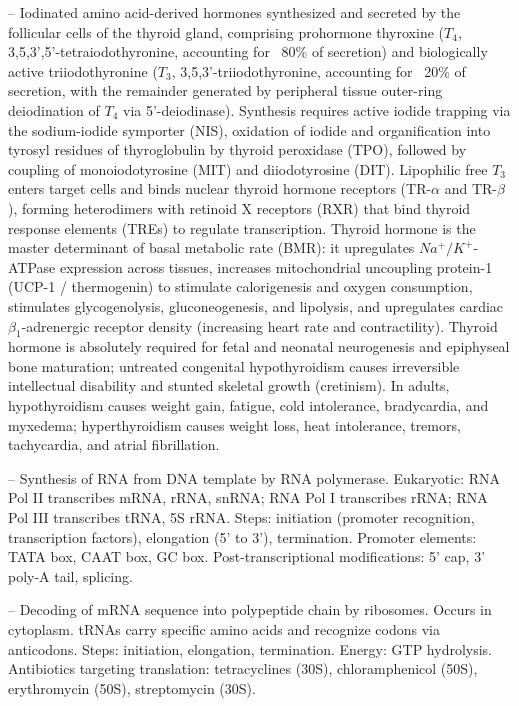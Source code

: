 -- Iodinated amino acid-derived hormones synthesized and secreted by the follicular cells of the thyroid gland, comprising prohormone thyroxine ($T_4$, 3,5,3',5'-tetraiodothyronine, accounting for ~80\% of secretion) and biologically active triiodothyronine ($T_3$, 3,5,3'-triiodothyronine, accounting for ~20\% of secretion, with the remainder generated by peripheral tissue outer-ring deiodination of $T_4$ via 5'-deiodinase). Synthesis requires active iodide trapping via the sodium-iodide symporter (NIS), oxidation of iodide and organification into tyrosyl residues of thyroglobulin by thyroid peroxidase (TPO), followed by coupling of monoiodotyrosine (MIT) and diiodotyrosine (DIT). Lipophilic free $T_3$ enters target cells and binds nuclear thyroid hormone receptors (TR-$\alpha$ and TR-$\beta$), forming heterodimers with retinoid X receptors (RXR) that bind thyroid response elements (TREs) to regulate transcription. Thyroid hormone is the master determinant of basal metabolic rate (BMR): it upregulates $Na^+/K^+$-ATPase expression across tissues, increases mitochondrial uncoupling protein-1 (UCP-1 / thermogenin) to stimulate calorigenesis and oxygen consumption, stimulates glycogenolysis, gluconeogenesis, and lipolysis, and upregulates cardiac $\beta_1$-adrenergic receptor density (increasing heart rate and contractility). Thyroid hormone is absolutely required for fetal and neonatal neurogenesis and epiphyseal bone maturation; untreated congenital hypothyroidism causes irreversible intellectual disability and stunted skeletal growth (cretinism). In adults, hypothyroidism causes weight gain, fatigue, cold intolerance, bradycardia, and myxedema; hyperthyroidism causes weight loss, heat intolerance, tremors, tachycardia, and atrial fibrillation.

-- Synthesis of RNA from DNA template by RNA polymerase. Eukaryotic: RNA Pol II transcribes mRNA, rRNA, snRNA; RNA Pol I transcribes rRNA; RNA Pol III transcribes tRNA, 5S rRNA. Steps: initiation (promoter recognition, transcription factors), elongation (5' to 3'), termination. Promoter elements: TATA box, CAAT box, GC box. Post-transcriptional modifications: 5' cap, 3' poly-A tail, splicing.

-- Decoding of mRNA sequence into polypeptide chain by ribosomes. Occurs in cytoplasm. tRNAs carry specific amino acids and recognize codons via anticodons. Steps: initiation, elongation, termination. Energy: GTP hydrolysis. Antibiotics targeting translation: tetracyclines (30S), chloramphenicol (50S), erythromycin (50S), streptomycin (30S).

